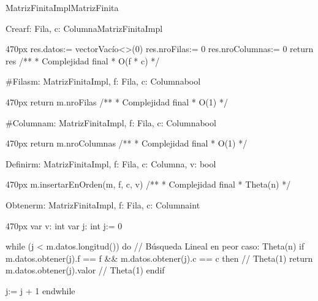 \documentclass[10pt,a4paper]{article}
\begin{document}
\begin{ModuloImplements}{MatrizFinitaImpl}{MatrizFinita}
  \begin{proc}{Crear}{\In f: Fila, \In c: Columna}{MatrizFinitaImpl}
    \begin{ImplementationCode}{470px}
      res.datos:= vectorVacío<>(0)
      res.nroFilas:= 0
      res.nroColumnas:= 0
      return res
      /**
       * Complejidad final
       * O(f * c)
       */
    \end{ImplementationCode}
  \end{proc}

  \begin{proc}{$\#$Filas}{\In m: MatrizFinitaImpl, \In f: Fila, \In c: Columna}{bool}
    \begin{ImplementationCode}{470px}
      return m.nroFilas
      /**
       * Complejidad final
       * O(1)
       */
    \end{ImplementationCode}
  \end{proc}

  \begin{proc}{$\#$Columna}{\In m: MatrizFinitaImpl, \In f: Fila, \In c: Columna}{bool}
    \begin{ImplementationCode}{470px}
      return m.nroColumnas
      /**
       * Complejidad final
       * O(1)
       */
    \end{ImplementationCode}
  \end{proc}

  \begin{proc}{Definir}{\Inout m: MatrizFinitaImpl, \In f: Fila, \In c: Columna, \In v: bool}{}
    \begin{ImplementationCode}{470px}
      m.insertarEnOrden(m, f, c, v)
      /**
       * Complejidad final
       * Theta(n)
       */
    \end{ImplementationCode}
  \end{proc}

  \begin{proc}{Obtener}{\Inout m: MatrizFinitaImpl, \In f: Fila, \In c: Columna}{int}
    \begin{ImplementationCode}{470px}
      var v: int
      var j: int
          j:= 0

      while (j < m.datos.longitud()) do // Búsqueda Lineal en peor caso:  Theta(n)
        if m.datos.obtener(j).f == f && m.datos.obtener(j).c == c then // Theta(1)
          return m.datos.obtener(j).valor                              // Theta(1)
        endif

        j:= j + 1
      endwhile
      

\end{ImplementationCode}
\end{proc}
\end{ModuloImplements}
\end{document}
